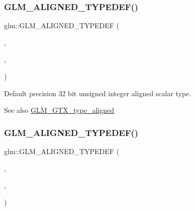 \subsubsection{\texorpdfstring{G\+L\+M\+\_\+\+A\+L\+I\+G\+N\+E\+D\+\_\+\+T\+Y\+P\+E\+D\+E\+F()}{GLM\_ALIGNED\_TYPEDEF()}\hspace{0.1cm}{\footnotesize\ttfamily [115/209]}}
{\footnotesize\ttfamily glm\+::\+G\+L\+M\+\_\+\+A\+L\+I\+G\+N\+E\+D\+\_\+\+T\+Y\+P\+E\+D\+EF (\begin{DoxyParamCaption}\item[{\hyperlink{group__gtc__type__precision_ga54e837745059fd29017bed71cfa0a8db}{u32}}]{,  }\item[{aligned\+\_\+u32}]{,  }\item[{4}]{ }\end{DoxyParamCaption})}

Default precision 32 bit unsigned integer aligned scalar type. \begin{DoxySeeAlso}{See also}
\hyperlink{group__gtx__type__aligned}{G\+L\+M\+\_\+\+G\+T\+X\+\_\+type\+\_\+aligned} 
\end{DoxySeeAlso}
\mbox{\label{group__gtx__type__aligned_ga0f033b21e145a1faa32c62ede5878993}} 
\subsubsection{\texorpdfstring{G\+L\+M\+\_\+\+A\+L\+I\+G\+N\+E\+D\+\_\+\+T\+Y\+P\+E\+D\+E\+F()}{GLM\_ALIGNED\_TYPEDEF()}\hspace{0.1cm}{\footnotesize\ttfamily [116/209]}}
{\footnotesize\ttfamily glm\+::\+G\+L\+M\+\_\+\+A\+L\+I\+G\+N\+E\+D\+\_\+\+T\+Y\+P\+E\+D\+EF (\begin{DoxyParamCaption}\item[{\hyperlink{group__gtc__type__precision_ga71cedd4972f9cb1a5e14dfe5ab83ecd7}{u64}}]{,  }\item[{aligned\+\_\+u64}]{,  }\item[{8}]{ }\end{DoxyParamCaption})}

